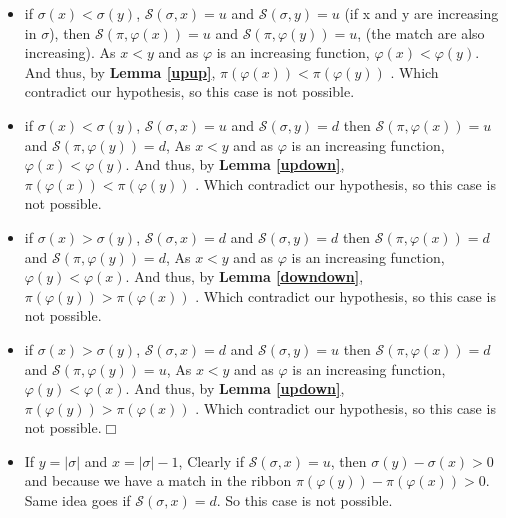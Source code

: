 \documentclass[a4paper]{llncs}
\newcommand{\ptext}{\pi}
\newcommand{\pmotif}{\sigma}
\newcommand{\dstep}{d}
\newcommand{\ustep}{u}
\begin{document}
		\begin{itemize}		
			\item if $\pmotif(x)<\pmotif(y)$, 
			$\mathcal{S}(\pmotif,x)=\ustep$ 
			and $\mathcal{S}(\pmotif,y)=\ustep$
			(if x and y are increasing in $\pmotif$),
			then $\mathcal{S}(\ptext,\varphi(x))=\ustep$ and $\mathcal{S}(\ptext,\varphi(y))=\ustep$,
			(the match are also increasing).
			As $x<y$ and as $\varphi$ is an increasing function, 
			$\varphi(x) < \varphi(y)$.
			And thus, by \textbf{Lemma \ref{upup}},
			$\ptext(\varphi(x)) < \ptext(\varphi(y))$ .
			Which contradict our hypothesis,
			so this case is not possible.
		
			\item if $\pmotif(x)<\pmotif(y)$, 
			$\mathcal{S}(\pmotif,x)=\ustep$ 
			and $\mathcal{S}(\pmotif,y)=\dstep$
			then $\mathcal{S}(\ptext,\varphi(x))=\ustep$ and $\mathcal{S}(\ptext,\varphi(y))=\dstep$,
			As $x<y$ and as $\varphi$ is an increasing function, 
			$\varphi(x) < \varphi(y)$.
			And thus, by \textbf{Lemma \ref{updown}},
			$\ptext(\varphi(x)) < \ptext(\varphi(y))$ .
			Which contradict our hypothesis,
			so this case is not possible.			

			\item if $\pmotif(x)>\pmotif(y)$, 
			$\mathcal{S}(\pmotif,x)=\dstep$ 
			and $\mathcal{S}(\pmotif,y)=\dstep$
			then $\mathcal{S}(\ptext,\varphi(x))=\dstep$ and $\mathcal{S}(\ptext,\varphi(y))=\dstep$,
			As $x<y$ and as $\varphi$ is an increasing function, 
			$\varphi(y) < \varphi(x)$.
			And thus, by \textbf{Lemma \ref{downdown}},
			$\ptext(\varphi(y)) > \ptext(\varphi(x))$ .
			Which contradict our hypothesis,
			so this case is not possible.
			
			\item if $\pmotif(x)>\pmotif(y)$, 
			$\mathcal{S}(\pmotif,x)=\dstep$ 
			and $\mathcal{S}(\pmotif,y)=\ustep$
			then $\mathcal{S}(\ptext,\varphi(x))=\dstep$ and $\mathcal{S}(\ptext,\varphi(y))=\ustep$,
			As $x<y$ and as $\varphi$ is an increasing function, 
			$\varphi(y) < \varphi(x)$.
			And thus, by \textbf{Lemma \ref{updown}},
			$\ptext(\varphi(y)) > \ptext(\varphi(x))$ .
			Which contradict our hypothesis,
			so this case is not possible.$\Box$
			
			\item If $y = |\pmotif|$ and $x=|\pmotif|-1$,
			Clearly if $\mathcal{S}(\pmotif,x)=\ustep$,
			then $\pmotif(y)-\pmotif(x)>0$ 
			and because we have a match in the ribbon
			$\ptext(\varphi(y))-\ptext(\varphi(x))>0$.
			Same idea goes if $\mathcal{S}(\pmotif,x)=\dstep$.
			So this case is not possible.
			

\end{itemize}
\end{document}
